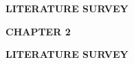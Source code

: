 \vspace*{\fill}
\begin{center}
  {\fontsize{18pt}{24pt}\selectfont\bfseries LITERATURE SURVEY\par}
\end{center}
\vspace*{\fill}
\newpage

\begin{center}
  {\fontsize{16pt}{20pt}\selectfont\bfseries CHAPTER 2\par}
  \vspace{0.3cm}
  {\fontsize{16pt}{20pt}\selectfont\bfseries LITERATURE SURVEY\par}
\end{center}
\vspace{0.25cm}

